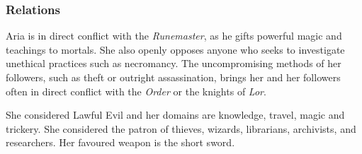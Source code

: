 \subsubsection*{Relations}

Aria is in direct conflict with the \emph{Runemaster}, as he gifts powerful
magic and teachings to mortals. She also openly opposes anyone who seeks to
investigate unethical practices such as necromancy. The uncompromising methods
of her followers, such as theft or outright assassination, brings her and her
followers often in direct conflict with the \emph{Order} or the knights of
\emph{Lor}.

\begin{35e}
  She considered Lawful Evil and her domains are knowledge, travel, magic and
  trickery. She considered the patron of thieves, wizards, librarians,
  archivists, and researchers. Her favoured weapon is the short sword.
\end{35e}
